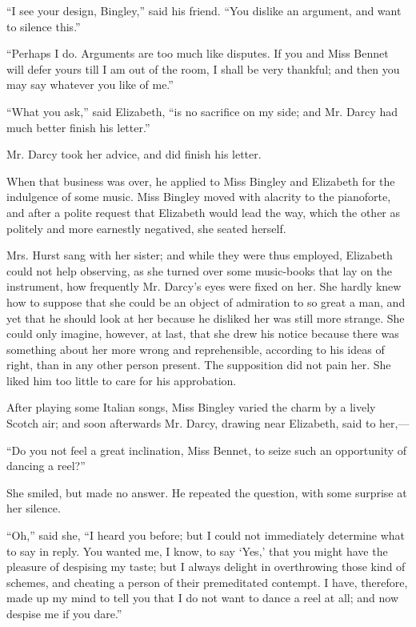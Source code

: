 \documentclass[10pt]{book}
\begin{document}
   “I see your design, Bingley,” said his friend. “You dislike an argument,
and want to silence this.”
  

   “Perhaps I do. Arguments are too much like disputes. If you and Miss
Bennet will defer yours till I am out of the room, I shall be very
thankful; and then you may say whatever you like of me.”
  

   “What you ask,” said Elizabeth, “is no sacrifice on my side; and Mr.
Darcy had much better finish his letter.”
  

   Mr. Darcy took her advice, and did finish his letter.
  

   When that business was over, he applied to Miss Bingley and Elizabeth
for the indulgence of some music. Miss Bingley moved with alacrity to
the pianoforte, and after a polite request that Elizabeth would lead the
way, which the other as politely and more earnestly negatived, she
seated herself.
  

   Mrs. Hurst sang with her sister; and while they were thus employed,
Elizabeth could not help observing, as she turned over some music-books
that lay on the instrument, how frequently Mr. Darcy’s eyes were fixed
on her. She hardly knew how to suppose that she could be an object of
admiration to so great a man, and yet that he should look at her because
he disliked her was still more strange. She could only imagine, however,
at last, that she drew his notice because there was something about her
more wrong and reprehensible, according to his ideas of right, than in
any other person present.
   The supposition did not pain her. She liked
him too little to care for his approbation.
  

   After playing some Italian songs, Miss Bingley varied the charm by a
lively Scotch air; and soon afterwards Mr. Darcy, drawing near
Elizabeth, said to her,—
  

   “Do you not feel a great inclination, Miss Bennet, to seize such an
opportunity of dancing a reel?”
  

   She smiled, but made no answer. He repeated the question, with some
surprise at her silence.
  

   “Oh,” said she, “I heard you before; but I could not immediately
determine what to say in reply. You wanted me, I know, to say ‘Yes,’
that you might have the pleasure of despising my taste; but I always
delight in overthrowing those kind of schemes, and cheating a person of
their premeditated contempt. I have, therefore, made up my mind to tell
you that I do not want to dance a reel at all; and now despise me if you
dare.”
  
\end{document}
